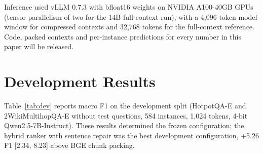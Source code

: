 \documentclass[11pt]{article}
\begin{document}
\begin{table}[h]
\centering
\small
{}
\caption{Implementation constants (all frozen before testing).}
\label{tab:impl}
\end{table}

Inference used vLLM 0.7.3 with bfloat16 weights on NVIDIA A100-40GB GPUs (tensor parallelism of two for the 14B full-context run), with a 4,096-token model window for compressed contexts and 32,768 tokens for the full-context reference. Code, packed contexts and per-instance predictions for every number in this paper will be released.

\section{Development Results}
\label{app:dev}
Table~\ref{tab:dev} reports macro F1 on the development split (HotpotQA-E and 2WikiMultihopQA-E without test questions, 584 instances, 1,024 tokens, 4-bit Qwen2.5-7B-Instruct). These results determined the frozen configuration; the hybrid ranker with sentence repair was the best development configuration, +5.26 F1 [2.34, 8.23] above BGE chunk packing.

\begin{table}[h]
\centering
\small
{}
\caption{Development macro F1 (1,024 tokens).}
\label{tab:dev}
\end{table}
\end{document}
